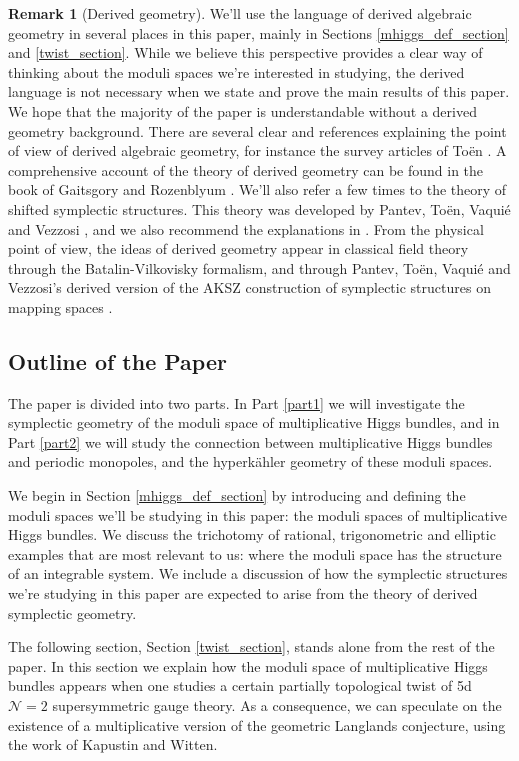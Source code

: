 \documentclass[11pt, oneside, reqno]{amsart}
\theoremstyle{definition} \newtheorem{definition}{Definition}[section]
\theoremstyle{definition} \newtheorem{remark}[definition]{Remark}
\theoremstyle{definition} \newtheorem{remarks}[definition]{Remarks}
\theoremstyle{definition} \newtheorem{question}[definition]{Question}
\theoremstyle{definition} \newtheorem*{note}{Note}
\theoremstyle{definition} \newtheorem{example}[definition]{Example}
\theoremstyle{definition} \newtheorem{examples}[definition]{Examples}
\newcommand{\mc}[1]{\mathcal{#1}}
\begin{document}
\begin{remark}[Derived geometry]
  We'll use the language of derived algebraic geometry in several places in this paper, mainly in Sections \ref{mhiggs_def_section} and \ref{twist_section}.  While we believe this perspective provides a clear way of thinking about the moduli spaces we're interested in studying, the derived language is not necessary when we state and prove the main results of this paper.  We hope that the majority of the paper is understandable without a derived geometry background.  There are several clear and references explaining the point of view of derived algebraic geometry, for instance the survey articles of To\"en \cite{ToenOverview,ToenSurvey}.  A comprehensive account of the theory of derived geometry can be found in the book of Gaitsgory and Rozenblyum \cite{GRvol1, GRvol2}.  We'll also refer a few times to the theory of shifted symplectic structures.  This theory was developed by Pantev, To\"en, Vaqui\'e and Vezzosi \cite{PTVV}, and we also recommend the explanations in \cite{Calaque}.  From the physical point of view, the ideas of derived geometry appear in classical field theory through the Batalin-Vilkovisky formalism, and through Pantev, To\"en, Vaqui\'e and Vezzosi's derived version of the AKSZ construction of symplectic structures on mapping spaces \cite{AKSZ}. 
\end{remark}

\subsection{Outline of the Paper}
The paper is divided into two parts.  In Part \ref{part1} we will investigate the symplectic geometry of the moduli space of multiplicative Higgs bundles, and in Part \ref{part2} we will study the connection between multiplicative Higgs bundles and periodic monopoles, and the hyperk\"ahler geometry of these moduli spaces.

We begin in Section \ref{mhiggs_def_section} by introducing and defining the moduli spaces we'll be studying in this paper: the moduli spaces of multiplicative Higgs bundles.  We discuss the trichotomy of rational, trigonometric and elliptic examples that are most relevant to us: where the moduli space has the structure of an integrable system.  We include a discussion of how the symplectic structures we're studying in this paper are expected to arise from the theory of derived symplectic geometry.

The following section, Section \ref{twist_section}, stands alone from the rest of the paper.  In this section we explain how the moduli space of multiplicative Higgs bundles appears when one studies a certain partially topological twist of 5d $\mc N=2$ supersymmetric gauge theory.  As a consequence, we can speculate on the existence of a multiplicative version of the geometric Langlands conjecture, using the work of Kapustin and Witten.
\end{document}
